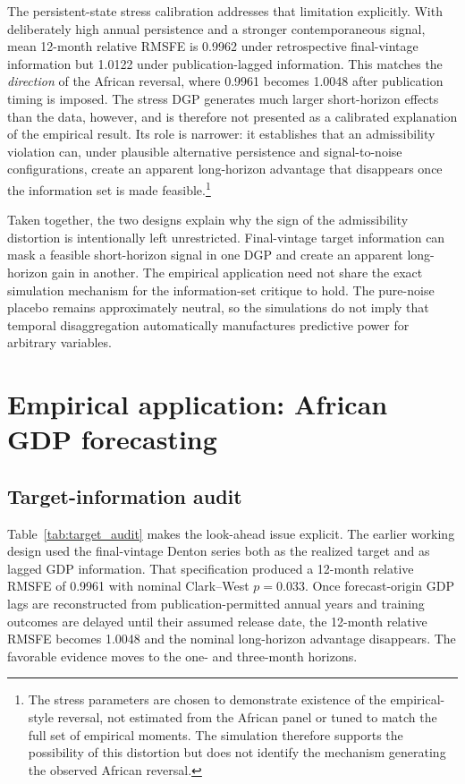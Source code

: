\documentclass[preprint,12pt,authoryear]{elsarticle}
\begin{document}
The persistent-state stress calibration addresses that limitation explicitly. With deliberately high annual persistence and a stronger contemporaneous signal, mean 12-month relative RMSFE is 0.9962 under retrospective final-vintage information but 1.0122 under publication-lagged information. This matches the \emph{direction} of the African reversal, where 0.9961 becomes 1.0048 after publication timing is imposed. The stress DGP generates much larger short-horizon effects than the data, however, and is therefore not presented as a calibrated explanation of the empirical result. Its role is narrower: it establishes that an admissibility violation can, under plausible alternative persistence and signal-to-noise configurations, create an apparent long-horizon advantage that disappears once the information set is made feasible.\footnote{The stress parameters are chosen to demonstrate existence of the empirical-style reversal, not estimated from the African panel or tuned to match the full set of empirical moments. The simulation therefore supports the possibility of this distortion but does not identify the mechanism generating the observed African reversal.}

Taken together, the two designs explain why the sign of the admissibility distortion is intentionally left unrestricted. Final-vintage target information can mask a feasible short-horizon signal in one DGP and create an apparent long-horizon gain in another. The empirical application need not share the exact simulation mechanism for the information-set critique to hold. The pure-noise placebo remains approximately neutral, so the simulations do not imply that temporal disaggregation automatically manufactures predictive power for arbitrary variables.

\section{Empirical application: African GDP forecasting}
\subsection{Target-information audit}
Table~\ref{tab:target_audit} makes the look-ahead issue explicit. The earlier working design used the final-vintage Denton series both as the realized target and as lagged GDP information. That specification produced a 12-month relative RMSFE of 0.9961 with nominal Clark--West $p=0.033$. Once forecast-origin GDP lags are reconstructed from publication-permitted annual years and training outcomes are delayed until their assumed release date, the 12-month relative RMSFE becomes 1.0048 and the nominal long-horizon advantage disappears. The favorable evidence moves to the one- and three-month horizons.
\end{document}
